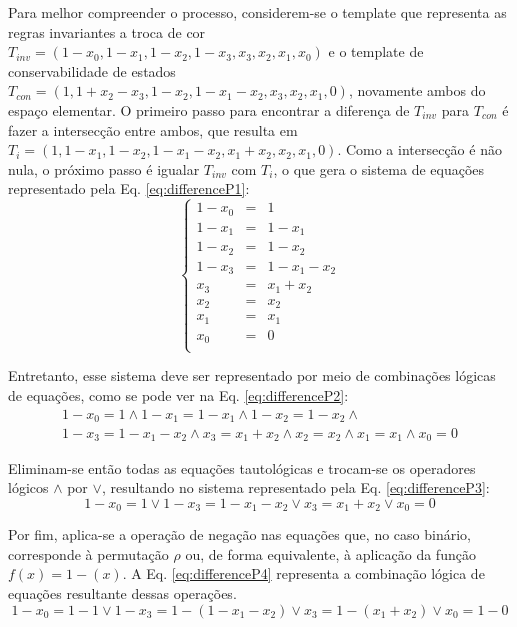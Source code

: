 \documentclass[12pt, a4paper]{article}
\begin{document}
Para melhor compreender o processo, considerem-se o template que representa as regras invariantes a troca de cor $T_{inv} = (1 - x_0, 1 - x_1, 1 - x_2, 1 - x_3, x_3, x_2, x_1, x_0)$ e o template de conservabilidade de estados $T_{con} = (1, 1 + x_2 - x_3, 1 - x_2, 1 - x_1 - x_2, x_3, x_2, x_1, 0)$, novamente ambos do espaço elementar. O primeiro passo para encontrar a diferença de $T_{inv}$ para $T_{con}$ é fazer a intersecção entre ambos, que resulta em $T_i = (1, 1 - x_1, 1 - x_2, 1 - x_1 - x_2, x_1 + x_2, x_2, x_1, 0)$. Como a intersecção é não nula, o próximo passo é igualar $T_{inv}$ com $T_i$, o que gera o sistema de equações representado pela Eq. \ref{eq:differenceP1}: \begin{equation} \left\{\begin{matrix} 1 - x_0	& = &	1				\\ 1 - x_1	& = &	1 - x_1			\\ 1 - x_2	& = &	1 - x_2			\\ 1 - x_3	& = &	1 - x_1 - x_2	\\
x_3		& = &	x_1 + x_2		\\
x_2		& = &	x_2				\\
x_1		& = &	x_1				\\
x_0		& = &	0				\\
\end{matrix}\right.
\label{eq:differenceP1}
\end{equation}

Entretanto, esse sistema deve ser representado por meio de combinações lógicas de equações, como se pode ver na Eq. \ref{eq:differenceP2}:
\begin{equation}
\begin{split}
1 - x_0	= 1				\wedge
1 - x_1	= 1 - x_1		\wedge
1 - x_2	= 1 - x_2		\wedge\\
1 - x_3	= 1 - x_1 - x_2	\wedge 
x_3		= x_1 + x_2		\wedge
x_2		= x_2			\wedge
x_1		= x_1			\wedge
x_0		= 0				
\label{eq:differenceP2}
\end{split}
\end{equation}

Eliminam-se então todas as equações tautológicas e trocam-se os operadores lógicos $\wedge$ por $\vee$, resultando no sistema representado pela Eq. \ref{eq:differenceP3}:
\begin{equation}
1 - x_0	= 1				\vee 
1 - x_3	= 1 - x_1 - x_2	\vee
x_3		= x_1 + x_2		\vee 
x_0		= 0				
\label{eq:differenceP3}
\end{equation}

Por fim, aplica-se a operação de negação nas equações que, no caso binário, corresponde à permutação $\rho $ ou,  de forma equivalente, à aplicação da função $f(x) = 1 - (x)$. A Eq. \eqref{eq:differenceP4} representa a combinação lógica de equações resultante dessas operações.
\begin{equation}
1 - x_0	= 1 - 1					\vee 
1 - x_3	= 1 - (1 - x_1 - x_2)	\vee
x_3		= 1 - (x_1 + x_2)		\vee 
x_0		= 1 - 0				
\label{eq:differenceP4}
\end{equation}
\end{document}

